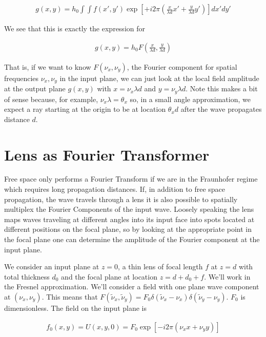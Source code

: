 \documentclass[12pt]{article}
\begin{document}
\begin{align}
g(x,y) = h_0\int \int f(x', y') \exp\left[ +i2\pi\left(\frac{x}{\lambda d}x' + \frac{y}{\lambda d} y'\right)\right] dx' dy'
\end{align}

We see that this is exactly the expression for

\begin{align}
g(x,y) =h_0 F\left(\frac{x}{\lambda d}, \frac{y}{\lambda d}\right)
\end{align}

That is, if we want to know $F(\nu_x,\nu_y)$, the Fourier component for spatial frequencies $\nu_x, \nu_y$ in the input plane, we can just look at the local field amplitude at the output plane $g(x,y)$ with $x = \nu_x \lambda d$ and $y = \nu_y \lambda d$. Note this makes a bit of sense because, for example, $\nu_x \lambda = \theta_x$ so, in a small angle approximation, we expect a ray starting at the origin to be at location $\theta_x d$ after the wave propagates distance $d$.

\section{Lens as Fourier Transformer}

Free space only performs a Fourier Transform if we are in the Fraunhofer regime which requires long propagation distances. If, in addition to free space propagation, the wave travels through a lens it is also possible to spatially multiplex the Fourier Components of the input wave. Loosely speaking the lens maps waves traveling at different angles into its input face into spots located at different positions on the focal plane, so by looking at the appropriate point in the focal plane one can determine the amplitude of the Fourier component at the input plane.

We consider an input plane at $z=0$, a thin lens of focal length $f$ at $z=d$ with total thickness $d_0$ and the focal plane at location $z=d+d_0+f$. We'll work in the Fresnel approximation. We'll consider a field with one plane wave component at $(\nu_x,\nu_y)$. This means that $F(\tilde{\nu}_x,\tilde{\nu}_y) = F_0 \delta(\tilde{\nu}_x-\nu_x)\delta(\tilde{\nu}_y - \nu_y)$. $F_0$ is dimensionless. The field on the input plane is 

\begin{align}
f_0(x,y) = U(x,y,0) = F_0 \exp[-i2\pi(\nu_x x + \nu_y y)]
\end{align}
\end{document}
